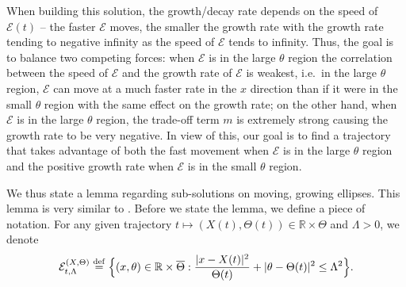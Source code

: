 \documentclass[11pt]{article}    %
\newcommand{\R}{\mathbb{R}}
\begin{document}
When building this solution, the growth/decay rate depends on the speed of $\mathcal{E}(t)$ -- the faster $\mathcal{E}$ moves, the smaller the growth rate with the growth rate tending to negative infinity as the speed of $\mathcal{E}$ tends to infinity.  Thus, the goal is to balance two competing forces: when $\mathcal{E}$ is in the large $\theta$ region the correlation between the speed of $\mathcal{E}$ and the growth rate of $\mathcal{E}$ is weakest, i.e.~in the large $\theta$ region, $\mathcal{E}$ can move at a much faster rate in the $x$ direction than if it were in the small $\theta$ region with the same effect on the growth rate; on the other hand, when $\mathcal{E}$ is in the large $\theta$ region, the trade-off term $m$ is extremely strong causing the growth rate to be very negative.  In view of this, our goal is to find a trajectory that takes advantage of both the fast movement when $\mathcal{E}$ is in the large $\theta$ region and the positive growth rate when $\mathcal{E}$ is in the small $\theta$ region.

We thus state a lemma regarding sub-solutions on moving, growing ellipses. This lemma is very similar to \cite[Lemma~4.1]{BHR_Acceleration}.  Before we state the lemma, we define a piece of notation.  For any given trajectory $t \mapsto \left( X(t) , \Theta(t) \right) \in \R\times\Theta$ and $\Lambda > 0$, we denote 
\begin{equation}\label{eq:ellipse_defn}
 	\mathcal{E}_{t,\Lambda}^{\left( X , \Theta \right)}
		\stackrel{\rm def}{=}
		\Big\{
			(x,\theta) \in \R \times \overline\Theta : \frac{\vert x - X(t) \vert^2}{\Theta(t)} + \vert \theta - \Theta(t) \vert^2 \leq \Lambda^2
		\Big\}.
\end{equation}
\end{document}
